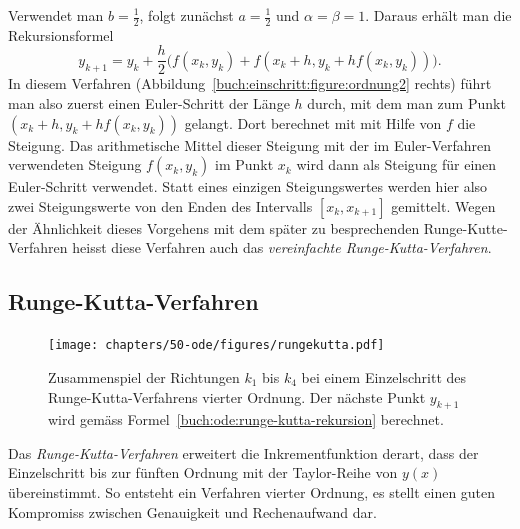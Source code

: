 Verwendet man $b=\frac12$, folgt zunächst $a=\frac12$ und $\alpha=\beta=1$.
Daraus erhält man die Rekursionsformel
\begin{equation}
y_{k+1}=y_k+\frac{h}2\biggl(
f(x_k,y_k) + f(x_k+h, y_k + hf(x_k,y_k))
\biggr).
\label{buch:ode:simplified-runge-kutta}
\end{equation}
In diesem Verfahren
(Abbildung~\ref{buch:einschritt:figure:ordnung2} rechts)
führt man also zuerst einen Euler-Schritt der Länge
$h$ durch, mit dem man zum Punkt $(x_k+h, y_k+hf(x_k,y_k))$ gelangt.
Dort berechnet mit mit Hilfe von $f$ die Steigung.
Das arithmetische Mittel dieser Steigung mit der im Euler-Verfahren
verwendeten Steigung $f(x_k,y_k)$ im Punkt $x_k$ wird dann als
Steigung für einen Euler-Schritt verwendet.
Statt eines einzigen Steigungswertes werden hier also zwei Steigungswerte
von den Enden des Intervalls $[x_k,x_{k+1}]$ gemittelt.
Wegen der Ähnlichkeit dieses Vorgehens mit dem später zu besprechenden
Runge-Kutte-Verfahren heisst diese Verfahren auch das
{\em vereinfachte Runge-Kutta-Verfahren}.
%
%

\subsection{Runge-Kutta-Verfahren\label{subsection:buch:ode:runge-kutta}}
%
\begin{figure}
\centering
\texttt{[image: chapters/50-ode/figures/rungekutta.pdf]}
\caption{Zusammenspiel der Richtungen $k_1$ bis $k_4$ bei einem
Einzelschritt des Runge-Kutta-Verfahrens vierter Ordnung.
Der nächste Punkt $y_{k+1}$ wird gemäss
Formel~\eqref{buch:ode:runge-kutta-rekursion} berechnet.
%
\label{buch:ode:rk-step}}
\end{figure}
Das {\em Runge-Kutta-Verfahren} erweitert die Inkrementfunktion derart,
dass der Einzelschritt bis zur fünften Ordnung mit der Taylor-Reihe von
$y(x)$ übereinstimmt.
%
%
So entsteht ein Verfahren vierter Ordnung, es stellt einen guten Kompromiss
zwischen Genauigkeit und Rechenaufwand dar.
%
%

